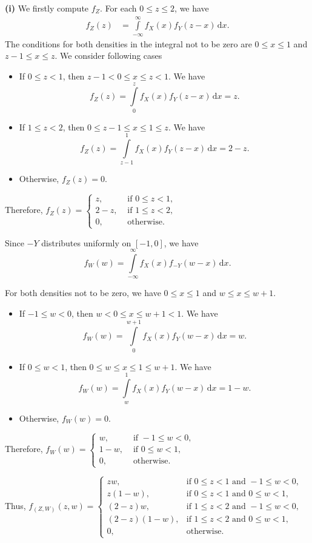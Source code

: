 \textbf{(i)} We firstly compute $f_Z$. For each $0\le z\le 2$, we have
\begin{align*}
    f_Z(z) 
    &= \int\limits_{-\infty}^{\infty} f_X(x)f_Y(z-x)\,\mathrm{d}x.
\end{align*}
The conditions for both densities in the integral not to be zero are $0\le x\le 1$ and $z-1\le x\le z$. We consider following cases
\begin{itemize}
    \item If $0\le z < 1$, then $z-1 < 0 \le x \le z < 1$. We have
    $$f_Z(z) 
    = \int\limits_{0}^{z} f_X(x)f_Y(z-x)\,\mathrm{d}x = z.$$
    \item If $1 \le z < 2$, then $0 \le z-1 \le x \le 1 \le z$. We have
    $$f_Z(z) 
    = \int\limits_{z-1}^{1} f_X(x)f_Y(z-x)\,\mathrm{d}x = 2-z.$$
    \item Otherwise, $f_Z(z)=0$.
\end{itemize}

Therefore, $f_Z(z)=\begin{cases}
    z, & \text{ if } 0\le z< 1,\\
    2-z, & \text{ if } 1\le z< 2,\\
    0, & \text{ otherwise.}
\end{cases}$

Since $-Y$ distributes uniformly on $[-1,0]$, we have
$$f_W(w) = \int\limits_{-\infty}^{\infty} f_X(x)f_{-Y}(w-x)\,\mathrm{d}x.$$

For both densities not to be zero, we have $0\le x\le 1$ and $w\le x\le w+1$.

\begin{itemize}
    \item If $-1\le w < 0$, then $w<0\le x \le w+1 < 1$. We have
    $$f_W(w) 
    = \int\limits_{0}^{w+1} f_X(x)f_Y(w-x)\,\mathrm{d}x = w.$$
    \item If $0\le w < 1$, then $0\le w\le x \le 1 \le w+1$. We have
    $$f_W(w) 
    = \int\limits_{w}^{1} f_X(x)f_Y(w-x)\,\mathrm{d}x = 1-w.$$
    \item Otherwise, $f_W(w)= 0$.
\end{itemize}

Therefore, $f_W(w)=\begin{cases}
    w, & \text{ if } -1\le w< 0,\\
    1-w, & \text{ if } 0\le w< 1,\\
    0, & \text{ otherwise.}
\end{cases}$

Thus, $f_{(Z,W)}(z,w)=\begin{cases}
    zw, & \text{if } 0\le z< 1 \text{ and } -1\le w< 0,\\
    z(1-w), & \text{if } 0\le z< 1 \text{ and } 0\le w< 1,\\
    (2-z)w, & \text{if } 1\le z< 2 \text{ and } -1\le w< 0,\\
    (2-z)(1-w), & \text{if } 1\le z< 2 \text{ and } 0\le w< 1,\\
    0, & \text{otherwise.}
\end{cases}$

